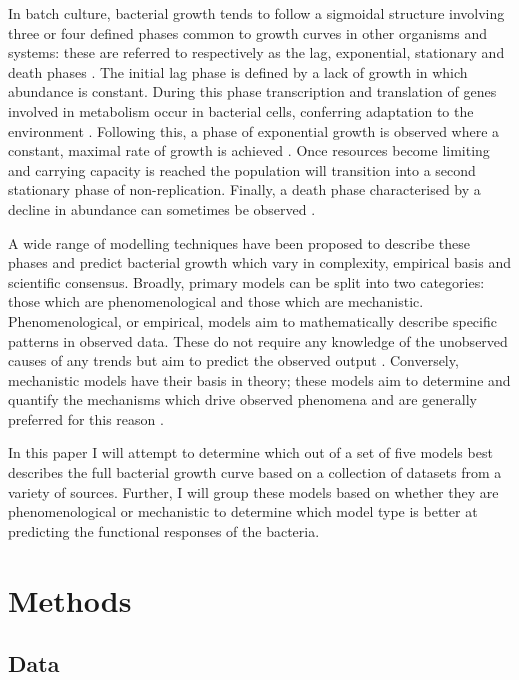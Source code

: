 \documentclass[11pt]{article}
\begin{document}
\begin{linenumbers}
        In batch culture, bacterial growth tends to follow a sigmoidal structure involving three or four defined phases common to growth curves in other organisms and systems: these are referred to respectively as the lag, exponential, stationary and death phases \citep{najafpour_chapter_2007}. The initial lag phase is defined by a lack of growth in which abundance is constant. During this phase transcription and translation of genes involved in metabolism occur in bacterial cells, conferring adaptation to the environment \citep{buchanan_when_1997}. Following this, a phase of exponential growth is observed where a constant, maximal rate of growth is achieved \citep{najafpour_chapter_2007}. Once resources become limiting and carrying capacity is reached the population will transition into a second stationary phase of non-replication. Finally, a death phase characterised by a decline in abundance can sometimes be observed \citep{zwietering_modeling_1990}.
        
        A wide range of modelling techniques have been proposed to describe these phases and predict bacterial growth which vary in complexity, empirical basis and scientific consensus. Broadly, primary models can be split into two categories: those which are phenomenological and those which are mechanistic. Phenomenological, or empirical, models aim to mathematically describe specific patterns in observed data. These do not require any knowledge of the unobserved causes of any trends but aim to predict the observed output \citep{vlazaki_integrating_2019}. Conversely, mechanistic models have their basis in theory; these models aim to determine and quantify the mechanisms which drive observed phenomena and are generally preferred for this reason \citep{lopez_statistical_2004, ferrer_mathematical_2009}. 
        
        In this paper I will attempt to determine which out of a set of five models best describes the full bacterial growth curve based on a collection of datasets from a variety of sources. Further, I will group these models based on whether they are phenomenological or mechanistic to determine which model type is better at predicting the functional responses of the bacteria.


    \section{Methods}

        \subsection{Data}


\end{linenumbers}
\end{document}
